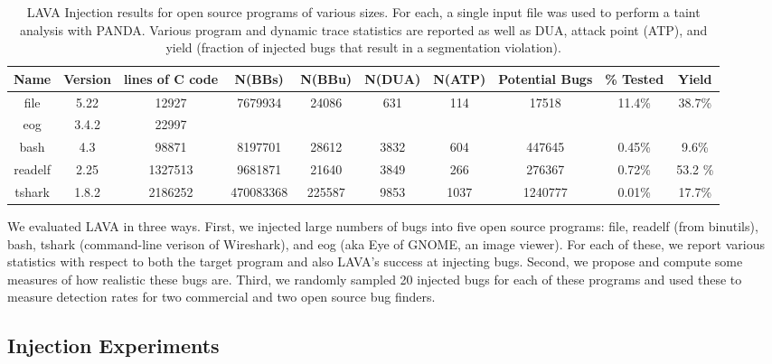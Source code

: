 
\label{section:results}

\begin{table}[t!]
\centering
\begin{tabular}{c|c|c|c|c|c|c|c|c|c} 
Name    & Version & lines of C code & N(BBs)     & N(BBu)   & N(DUA)  & N(ATP) & Potential Bugs & \% Tested & Yield \\\hline
file    & 5.22    & 12927           & 7679934    & 24086    & 631     & 114    & 17518          & 11.4\%    & 38.7\%  \\
eog     & 3.4.2   & 22997           &            &          &         &        &                &           & \\ 
bash    & 4.3     & 98871           & 8197701    & 28612    & 3832    & 604    & 447645         & 0.45\%    & 9.6\% \\
readelf & 2.25    & 1327513         & 9681871    & 21640    & 3849    & 266    & 276367         & 0.72\%    & 53.2 \% \\
tshark  & 1.8.2   & 2186252         & 470083368  & 225587   & 9853    & 1037   & 1240777        & 0.01\%    & 17.7\% \\
\end{tabular}
\caption{LAVA Injection results for open source programs of various sizes.
For each, a single input file was used to perform a taint analysis with PANDA.
Various program and dynamic trace statistics are reported as well as DUA, attack point (ATP), and yield (fraction of injected bugs that result in a segmentation violation).}
\label{table:insertion-results}
\end{table}

We evaluated LAVA in three ways.
First, we injected large numbers of bugs into five open source programs: file, readelf (from binutils), bash, tshark (command-line verison of Wireshark), and eog (aka Eye of GNOME, an image viewer).
For each of these, we report various statistics with respect to both the target program and also LAVA's success at injecting bugs.
Second, we propose and compute some measures of how realistic these bugs are.
Third, we randomly sampled 20 injected bugs for each of these programs and used these to measure detection rates for two commercial and two open source bug finders.

\subsection{Injection Experiments}

